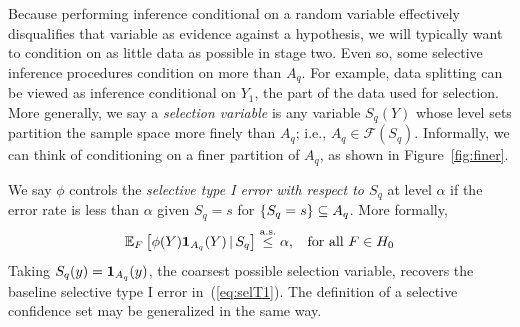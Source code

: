 \documentclass{article}
\theoremstyle{definition}
\newcommand{\sF}{\mathscr{F}}
\newcommand{\leqAS}{\overset{\textrm{a.s.}}{\leq}}
\newcommand{\sampOrData}{data }
\begin{document}
Because performing inference conditional on a random variable effectively disqualifies that variable as evidence against a hypothesis, we will typically want to condition on as little data as possible in stage two. Even so, some selective inference procedures condition on more than $A_q$. For example, \sampOrData splitting can be viewed as inference conditional on $Y_{1}$, the part of the data used for selection. More generally, we say a {\em selection variable} is any variable $S_q(Y)$ whose level sets partition the sample space more finely than $A_q$; i.e., $A_q \in \sF(S_q)$. Informally, we can think of conditioning on a finer partition of $A_q$, as shown in Figure~\ref{fig:finer}.


We say $\phi$ controls the {\em selective type I error with respect to $S_q$} at level $\alpha$ if the error rate is less than $\alpha$ given $S_q=s$ for $\{S_q=s\}\subseteq A_q$. More formally,
\begin{equation}\label{eq:selT1S}
  \E_F\left[\phi(Y)\1_{A_q}(Y) \gv S_q \right] \leqAS \alpha, \;\;\text{ for all } F\in H_0
\end{equation}
Taking $S_q(y) = \mathbf{1}_{A_q}(y)$, the coarsest possible selection variable, recovers the baseline selective type I error in~(\ref{eq:selT1}). The definition of a selective confidence set may be generalized in the same way.
\end{document}
